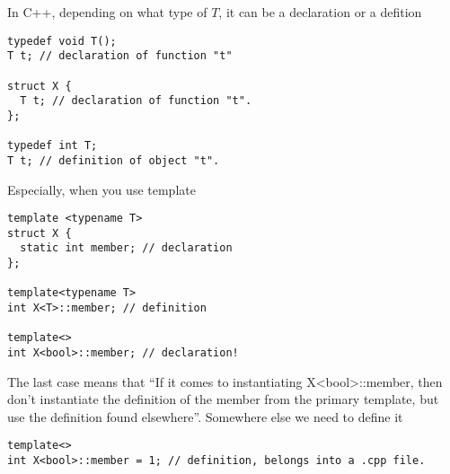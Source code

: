 In C++, depending on what type of $T$, it can be a declaration or a defition
\begin{verbatim}
typedef void T();
T t; // declaration of function "t"

struct X { 
  T t; // declaration of function "t".
};

typedef int T;
T t; // definition of object "t".
\end{verbatim}
Especially, when you use template
\begin{verbatim}
template <typename T>
struct X { 
  static int member; // declaration
};

template<typename T>
int X<T>::member; // definition

template<>
int X<bool>::member; // declaration!
\end{verbatim}
The last case means that ``If it comes to instantiating X<bool>::member, then
don't instantiate the definition of the member from the primary template, but
use the definition found elsewhere''. Somewhere else we need to define it
\begin{verbatim}
template<>
int X<bool>::member = 1; // definition, belongs into a .cpp file.
\end{verbatim}


